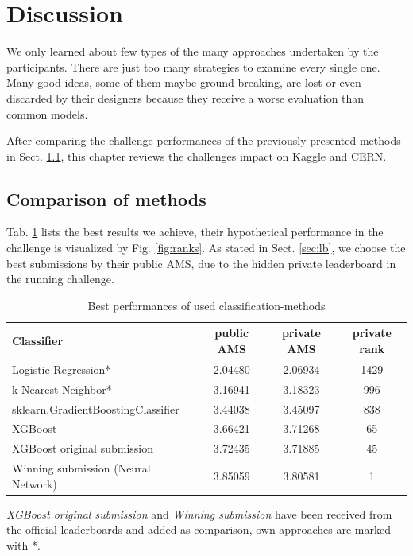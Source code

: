 \section{Discussion}\label{ch:disc}\raggedbottom
We only learned about few types of the many approaches undertaken by the participants. There are just too many strategies to examine every single one. Many good ideas, some of them maybe ground-breaking, are lost or even discarded by their designers because they receive a worse evaluation than common models.

After comparing the challenge performances of the previously presented methods in Sect. \ref{sec:comp}, this chapter reviews the challenges impact on Kaggle and CERN.

\subsection{Comparison of methods}\label{sec:comp}
Tab. \ref{tab:bestams} lists the best results we achieve, their hypothetical performance in the challenge is visualized by Fig. \ref{fig:ranks}. As stated in Sect. \ref{sec:lb}, we choose the best submissions by their public AMS, due to the hidden private leaderboard in the running challenge.

\begin{table}[h]
\begin{tabular}{|l|c|c|c|}
	\hline
	Classifier & public AMS & private AMS & private rank \\
	\hline
	Logistic Regression* & 2.04480 & 2.06934 & 1429 \\
	\hline
	k Nearest Neighbor* & 3.16941 & 3.18323 & 996 \\
	\hline
	sklearn.GradientBoostingClassifier & 3.44038 & 3.45097 & 838\\
	\hline
	XGBoost & 3.66421 & 3.71268 & 65 \\
	\hline
	XGBoost original submission & 3.72435 & 3.71885 & 45 \\
	\hline
	Winning submission (Neural Network) & 3.85059 & 3.80581 & 1 \\
	\hline
\end{tabular}

\vspace{1ex}

\emph{XGBoost original submission} and \emph{Winning submission} have been received from the official leaderboards and added as comparison, own approaches are marked with *. 
\caption{Best performances of used classification-methods}
\label{tab:bestams}
\end{table}

